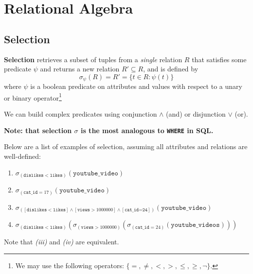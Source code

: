 \documentclass{report}
\newenvironment{definition}[1]{\begin{tcolorbox}[title={Definition: #1}]}{\end{tcolorbox}}
\renewcommand{\bf}[1]{\textbf{{#1}}}
\renewcommand{\tt}[1]{\texttt{{#1}}}
\renewcommand{\it}[1]{\textit{{#1}}}
\begin{document}
\chapter{Relational Algebra}

\section{Selection}
\begin{definition}{Selection}
    \bf{Selection} retrieves a subset of tuples from a \it{single} relation $R$ that satisfies some
    predicate $\psi$ and returns a new relation $R' \subseteq R$, and is defined by
    \[\sigma_{\psi}(R) = R' = \{ t \in R : \psi(t) \}\]
    where $\psi$ is a boolean predicate on attributes and values with respect to a unary or binary 
    operator\footnote{We may use the following operators: $\{=, \neq, <, >, \leq, \geq, \lnot \}$.}
\end{definition}
We can build complex predicates using conjunction $\land$ (and) or disjunction $\lor$ (or). 
\begin{center}\bf{Note: that selection $\sigma$ is the most analogous to \tt{WHERE} in SQL.} \end{center}
Below are a list of examples of selection, assuming all attributes and relations are well-defined:
\begin{enumerate}[label=\textit{(\roman*)}]
    \item $\sigma_{(\tt{dislikes} < \tt{likes})}(\tt{youtube\_video})$
    \item $\sigma_{(\tt{cat\_id} = 17)}(\tt{youtube\_video})$
    \item $\sigma_{([\tt{dislikes} < \tt{likes}] \land [\tt{views} > 1000000] \land [\tt{cat\_id=24}])}(\tt{youtube\_video})$
    \item $\sigma_{(\tt{dislikes} < \tt{likes})}(\sigma_{(\tt{views} > 1000000)}(\sigma_{(\tt{cat\_id} = 24)}(\tt{youtube\_videos})))$
\end{enumerate}
Note that \it{(iii)} and \it{(iv)} are equivalent.
\end{document}
